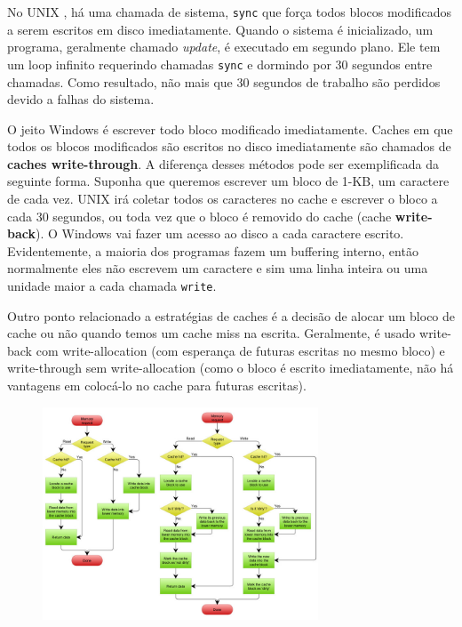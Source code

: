 \documentclass{article}
\newcommand\unix{{\color{red}UNIX} }
\begin{document}
No \unix, há uma chamada de sistema, \verb|sync| que força todos blocos modificados a serem escritos em disco imediatamente. Quando o sistema é inicializado, um programa, geralmente chamado \textit{update}, é executado em segundo plano. Ele tem um loop infinito requerindo chamadas \verb|sync| e dormindo por 30 segundos entre chamadas. Como resultado, não mais que 30 segundos de trabalho são perdidos devido a falhas do sistema.

O jeito Windows é escrever todo bloco modificado imediatamente. Caches em que todos os blocos modificados são escritos no disco imediatamente são chamados de \textbf{caches write-through}. A diferença desses métodos pode ser exemplificada da seguinte forma. Suponha que queremos escrever um bloco de 1-KB, um caractere de cada vez. \unix irá coletar todos os caracteres no cache e escrever o bloco a cada 30 segundos, ou toda vez que o bloco é removido do cache (cache \textbf{write-back}). O Windows vai fazer um acesso ao disco a cada caractere escrito. Evidentemente, a maioria dos programas fazem um buffering interno, então normalmente eles não escrevem um caractere e sim uma linha inteira ou uma unidade maior a cada chamada \verb|write|.

Outro ponto relacionado a estratégias de caches é a decisão de alocar um bloco de cache ou não quando temos um cache miss na escrita. Geralmente, é usado write-back com write-allocation (com esperança de futuras escritas no mesmo bloco) e write-through sem write-allocation (como o bloco é escrito imediatamente, não há vantagens em colocá-lo no cache para futuras escritas). 

\begin{figure}[h]
  \begin{center}
    \includegraphics[width=0.73\textwidth]{img/cache.jpg}
  \end{center}
  \caption{}
  \label{fig:}
\end{figure}
\end{document}
